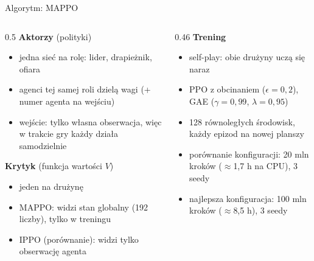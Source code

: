 \documentclass[aspectratio=169,10pt]{beamer}
\begin{document}
\begin{frame}{Algorytm: MAPPO}
  \small
  \begin{columns}[T]
    \begin{column}{0.5\textwidth}
      \textbf{Aktorzy} (polityki)
      \begin{itemize}
        \item jedna sieć na rolę: lider, drapieżnik, ofiara
        \item agenci tej samej roli dzielą wagi (+ numer agenta na wejściu)
        \item wejście: tylko własna obserwacja, więc w trakcie gry każdy działa samodzielnie
      \end{itemize}
      \textbf{Krytyk} (funkcja wartości $V$)
      \begin{itemize}
        \item jeden na drużynę
        \item \alert{MAPPO}: widzi stan globalny (192 liczby), tylko w treningu
        \item \alert{IPPO} (porównanie): widzi tylko obserwację agenta
      \end{itemize}
    \end{column}
    \begin{column}{0.46\textwidth}
      \textbf{Trening}
      \begin{itemize}
        \item self-play: obie drużyny uczą się naraz
        \item PPO z obcinaniem ($\epsilon=0{,}2$), GAE ($\gamma=0{,}99$, $\lambda=0{,}95$)
        \item 128 równoległych środowisk, każdy epizod na nowej planszy
        \item porównanie konfiguracji: 20 mln kroków ($\approx$1,7 h na CPU), 3 seedy
        \item najlepsza konfiguracja: 100 mln kroków ($\approx$8,5 h), 3 seedy
      \end{itemize}
    \end{column}
  \end{columns}
\end{frame}
\end{document}
